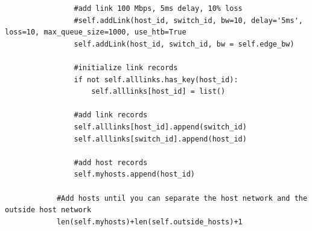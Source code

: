 \documentclass[12pt,english,oneside]{book}
\begin{document}
\begin{lstlisting}
                #add link 100 Mbps, 5ms delay, 10% loss
                #self.addLink(host_id, switch_id, bw=10, delay='5ms', loss=10, max_queue_size=1000, use_htb=True
                self.addLink(host_id, switch_id, bw = self.edge_bw)
                
                #initialize link records
                if not self.alllinks.has_key(host_id):
                    self.alllinks[host_id] = list()
                    
                #add link records
                self.alllinks[host_id].append(switch_id)
                self.alllinks[switch_id].append(host_id)
                
                #add host records
                self.myhosts.append(host_id)
            
            #Add hosts until you can separate the host network and the outside host network
            len(self.myhosts)+len(self.outside_hosts)+1
\end{lstlisting}
\end{document}
